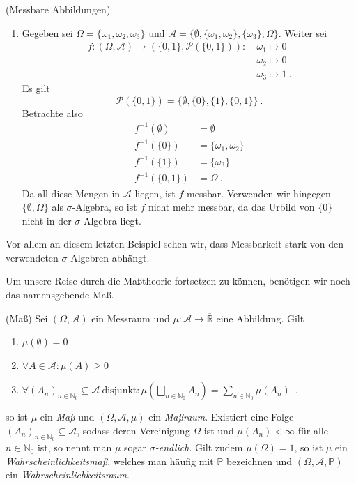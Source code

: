 \begin{Beispiel}{(Messbare Abbildungen)}
\begin{enumerate}[label=(\roman*)]
\item Gegeben sei $\Omega = \{\omega_1, \omega_2, \omega_3\}$ und $\mathscr{A} = \{ \emptyset, \{\omega_1, \omega_2\}, \{\omega_3\}, \Omega\}$. Weiter sei
\begin{align*}
f: (\Omega, \mathscr{A}) \rightarrow (\{0, 1\}, \mathcal{P}(\{0, 1\})):~ &\omega_1 \mapsto 0\\
&\omega_2 \mapsto 0\\
&\omega_3 \mapsto 1~.
\end{align*}
Es gilt
\[\mathcal{P}(\{0, 1\}) = \{ \emptyset, \{0\}, \{1\}, \{0, 1\} \}~.\]
Betrachte also
\begin{align*}
f^{-1}(\emptyset) &= \emptyset\\
f^{-1}(\{0\}) &= \{\omega_1, \omega_2\}\\
f^{-1}(\{1\}) &= \{\omega_3\}\\
f^{-1}(\{0, 1\}) &= \Omega~.
\end{align*}
Da all diese Mengen in $\mathscr{A}$ liegen, ist $f$ messbar. Verwenden wir hingegen $\{\emptyset, \Omega\}$ als $\sigma$-Algebra, so ist $f$ nicht mehr messbar, da das Urbild von $\{0\}$ nicht in der $\sigma$-Algebra liegt.
\end{enumerate}
Vor allem an diesem letzten Beispiel sehen wir, dass Messbarkeit stark von den verwendeten $\sigma$-Algebren abhängt.
\end{Beispiel}

\newpage

Um unsere Reise durch die Maßtheorie fortsetzen zu können, benötigen wir noch das namensgebende Maß.

\begin{Definition}{(Maß)}
\hypertarget{Def:Maß}{}Sei $(\Omega, \mathscr{A})$ ein Messraum und $\mu: \mathscr{A} \rightarrow \overline{\mathbb{R}}$ eine Abbildung. Gilt
\begin{enumerate}[label=\textup{(M\arabic*)}]
\item $\mu(\emptyset) = 0$
\item $\forall A \in \mathscr{A}: \mu(A) \geq 0$
\item $\forall (A_n)_{n \in \mathbb{N}_0} \subseteq \mathscr{A} ~\text{disjunkt}: \mu\left(\bigsqcup_{n \in \mathbb{N}_0} A_n\right) = \sum_{n \in \mathbb{N}_0} \mu(A_n)$~,
\end{enumerate}
so ist $\mu$ ein \textit{Maß} und $(\Omega, \mathscr{A}, \mu)$ ein \textit{Maßraum}. Existiert eine Folge $(A_n)_{n \in \mathbb{N}_0} \subseteq \mathscr{A}$, sodass deren Vereinigung $\Omega$ ist und $\mu(A_n) < \infty$ für alle $n \in \mathbb{N}_0$ ist, so nennt man $\mu$ sogar \textit{$\sigma$-endlich}. Gilt zudem $\mu(\Omega) = 1$, so ist $\mu$ ein \textit{Wahrscheinlichkeitsmaß}, welches man häufig mit $\mathbb{P}$ bezeichnen und $(\Omega, \mathscr{A}, \mathbb{P})$ ein \textit{Wahrscheinlichkeitsraum}.
\end{Definition}

